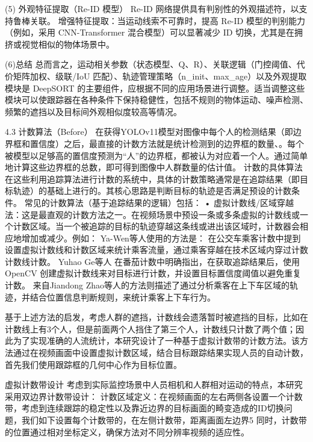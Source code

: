 (5) 外观特征提取（Re-ID 模型）
Re-ID 网络提供具有判别性的外观描述符，以支持鲁棒关联。
增强特征提取：当运动线索不可靠时，提高 Re-ID 模型的判别能力（例如，采用 CNN-Transformer 混合模型）可以显著减少 ID 切换，尤其是在拥挤或视觉相似的物体场景中。

(6)总结
总而言之，运动相关参数（状态模型、Q、R）、关联逻辑（门控阈值、代价矩阵加权、级联/IoU 匹配）、轨迹管理策略（n_init、max_age）以及外观提取模块是 DeepSORT 的主要组件，应根据不同的应用场景进行调整。适当调整这些模块可以使跟踪器在各种条件下保持稳健性，包括不规则的物体运动、噪声检测、频繁的遮挡以及目标间外观相似度较高等情况。

4.3 计数算法（Before）
在获得YOLOv11模型对图像中每个人的检测结果（即边界框和置信度）之后，最直接的计数方法就是统计检测到的边界框的数量、\cite{02_noauthor_review_nodate}\cite{68_zhao_detection_2022}。每个被模型以足够高的置信度预测为“人”的边界框，都被认为对应着一个人。通过简单地计算这些边界框的总数，即可得到图像中人群数量的估计值。
计数的具体算法
在这些利用追踪算法进行计数的系统中，具体的计数策略通常是在追踪结果（即目标轨迹）的基础上进行的。其核心思路是判断目标的轨迹是否满足预设的计数条件。
常见的计数算法（基于追踪结果的逻辑）包括：
• 虚拟计数线/区域穿越法：这是最直观的计数方法之一。在视频场景中预设一条或多条虚拟的计数线或一个计数区域。当一个被追踪的目标的轨迹穿越这条线或进出该区域时，计数器会相应地增加或减少。例如：  Ya-Wen等人使用的方法是： 在公交车乘客计数中提到设置虚拟计数线和计数区域来统计乘客流量，通过乘客穿越在技术区域内穿过计数计数线计数\cite{22_hsu_passenger_2020}。 Yuhao Ge等人 在番茄计数中明确指出，在获取追踪结果后，使用 OpenCV 创建虚拟计数线来对目标进行计数，并设置目标置信度阈值以避免重复计数\cite{204}。 来自Jiandong Zhao等人的方法则描述了通过分析乘客在上下车区域的轨迹，并结合位置信息判断规则，来统计乘客上下车行为\cite{68_zhao_detection_2022}。

基于上述方法的启发，考虑人群的遮挡，计数线会遗落暂时被遮挡的目标，比如在计数线上有3个人，但是前面两个人挡住了第三个人，计数线只计数了两个值；因此为了实现准确的人流统计，本研究设计了一种基于虚拟计数带的计数方法。该方法通过在视频画面中设置虚拟计数区域，结合目标跟踪结果实现人员的自动计数，首先我们使用跟踪框的几何中心作为目标位置。

虚拟计数带设计
考虑到实际监控场景中人员相机和人群相对运动的特点，本研究采用双边界计数带设计：
计数区域定义：在视频画面的左右两侧各设置一个计数带，考虑到连续跟踪的稳定性以及靠近边界的目标画面的畸变造成的ID切换问题，我们如下设置每个计数带的，在左侧计数带，距离画面左边界5%
    同时，计数带的位置通过相对坐标定义，确保方法对不同分辨率视频的适应性。


